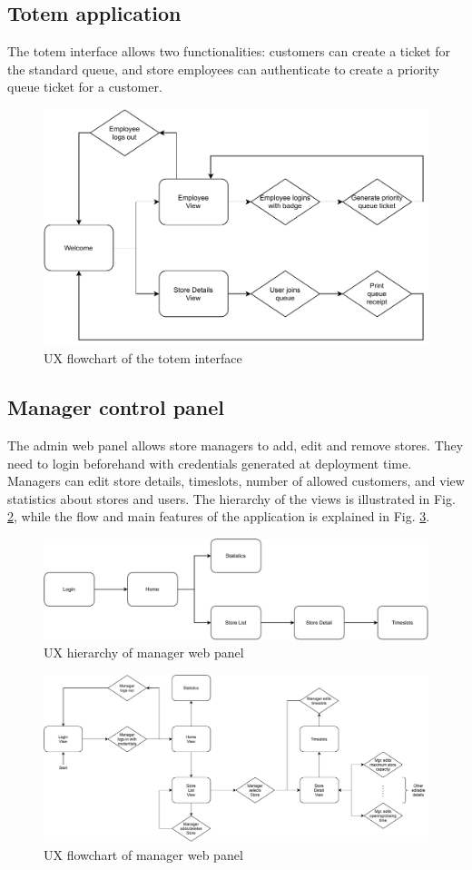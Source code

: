 \subsection{Totem application}

The totem interface allows two functionalities: customers can create a ticket for the standard queue, and store employees can authenticate to create a priority queue ticket for a customer.

\begin{figure}[H]
    \centering
    \includegraphics[width=.5\linewidth]{images/draw.io/ux_totem.pdf}
    \caption{UX flowchart of the totem interface}
    \label{fig:ux_totem}
\end{figure}

\subsection{Manager control panel}

The admin web panel allows store managers to add, edit and remove stores.
They need to login beforehand with credentials generated at deployment time.
Managers can edit store details, timeslots, number of allowed customers, and view statistics about stores and users. The hierarchy of the views is illustrated in Fig. \ref{fig:ux_manager_hierarchy}, while the flow and main features of the application is explained in Fig. \ref{fig:ux_manager_flowchart}.

\begin{figure}[H]
    \centering
    \includegraphics[width=\linewidth]{images/draw.io/ux_manager.pdf}
    \caption{UX hierarchy of manager web panel}
    \label{fig:ux_manager_hierarchy}
\end{figure}

\begin{figure}[H]
    \centering
    \includegraphics[width=\linewidth]{images/draw.io/ux_manager_flowchart.pdf}
    \caption{UX flowchart of manager web panel}
    \label{fig:ux_manager_flowchart}
\end{figure}